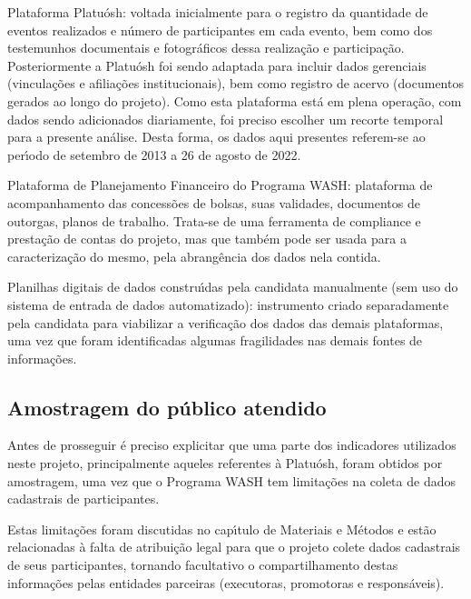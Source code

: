 \documentclass[
12pt,		%
openright,	%
twoside,  %
a4paper,			%
chapter=TITLE,		%
english,			%
french,				%
spanish,			%
brazil				%
]{USPSC-classe/USPSC}
\begin{document}
\begin{alineas}
\item Plataforma Platu\'osh: voltada inicialmente para o registro da quantidade de eventos realizados e n\'umero de participantes em cada evento, bem como dos testemunhos documentais e fotogr\'aficos dessa realiza\c{c}\~ao e participa\c{c}\~ao. Posteriormente a Platu\'osh foi sendo adaptada para incluir dados gerenciais (vincula\c{c}\~oes e afilia\c{c}\~oes institucionais), bem como registro de acervo (documentos gerados ao longo do projeto). Como esta plataforma est\'a em plena opera\c{c}\~ao, com dados sendo adicionados diariamente, foi preciso escolher um recorte temporal para a presente an\'alise. Desta forma, os dados aqui presentes referem-se ao per\'{\i}odo de setembro de 2013 a 26 de agosto de 2022.
\item Plataforma de Planejamento Financeiro do Programa WASH: plataforma de acompanhamento das concess\~oes de bolsas, suas validades, documentos de outorgas, planos de trabalho. Trata-se de uma ferramenta de compliance e presta\c{c}\~ao de contas do projeto, mas que tamb\'em pode ser usada para a caracteriza\c{c}\~ao do mesmo, pela abrang\^encia dos dados nela contida.
\item Planilhas digitais de dados constru\'{\i}das pela candidata manualmente (sem uso do sistema de entrada de dados automatizado): instrumento criado separadamente pela candidata para viabilizar a verifica\c{c}\~ao dos dados das demais plataformas, uma vez que foram identificadas algumas fragilidades nas demais fontes de informa\c{c}\~oes.
\end{alineas}

\subsection[Amostragem do p\'ublico atendido]{Amostragem do p\'ublico atendido}\label{Amostragem do p\'ublico atendido}
Antes de prosseguir \'e preciso explicitar que uma parte dos indicadores utilizados neste projeto, principalmente aqueles referentes \`a Platu\'osh, foram obtidos por amostragem, uma vez que o Programa WASH tem limita\c{c}\~oes na coleta de dados cadastrais de participantes.




Estas limita\c{c}\~oes foram discutidas no cap\'{\i}tulo de Materiais e M\'etodos e est\~ao relacionadas \`a falta de atribui\c{c}\~ao legal para que o projeto colete dados cadastrais de seus participantes, tornando facultativo o compartilhamento destas informa\c{c}\~oes pelas entidades parceiras (executoras, promotoras e respons\'aveis).
\end{document}
